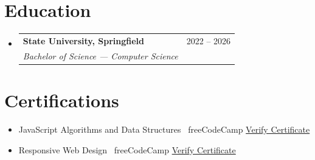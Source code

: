 \documentclass[11pt, a4paper]{article}
\makeatletter
\newcommand{\outerListStart}{%
  \begin{itemize}[
    leftmargin = 0pt,
    label      = {},
    itemsep    = 6pt,
    parsep     = 0pt,
    topsep     = 2pt,
    listparindent = 0pt
  ]%
}
\newcommand{\outerListEnd}{\end{itemize}}
\newcommand{\educationHeading}[4]{%
  \item
  \begin{tabularx}{\linewidth}{@{}X r@{}}
    \textbf{#1} & \small #2 \\
    \small\textit{#3} &
    \ifx\relax#4\relax\else\small\textit{#4}\fi
  \end{tabularx}%
  \vspace{-2pt}%
}
\makeatother
\begin{document}
\section{Education}

\outerListStart
  \educationHeading
    {State University, Springfield}
    {2022 -- 2026}
    {Bachelor of Science --- Computer Science}
    {\relax}
\outerListEnd

\section{Certifications}

\vspace{3pt}
\normalsize
\begin{itemize}[
  leftmargin = 14pt,
  label      = {\small\textbullet},
  itemsep    = 3pt,
  parsep     = 0pt,
  topsep     = 2pt
]
  \item \small JavaScript Algorithms and Data Structures \textemdash\ freeCodeCamp
  \hspace{6pt}\href{https://example.com/verify-1}{\color{linkblue}Verify Certificate}

  \item \small Responsive Web Design \textemdash\ freeCodeCamp
  \hspace{6pt}\href{https://example.com/verify-2}{\color{linkblue}Verify Certificate}
\end{itemize}

\end{document}
